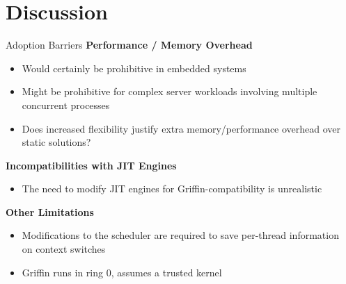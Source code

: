 \documentclass[12pt, dvipsnames, aspectratio=169]{beamer}
\begin{document}
\section{Discussion}

\begin{frame}[c]{Adoption Barriers}{}
  {\bf Performance / Memory Overhead}
  \begin{itemize}
    \item Would certainly be prohibitive in embedded systems
    \item Might be prohibitive for complex server workloads involving multiple concurrent processes
    \item Does increased flexibility justify extra memory/performance overhead over static solutions?
  \end{itemize}

  \vfill
  {\bf Incompatibilities with JIT Engines}
  \begin{itemize}
    \item The need to modify JIT engines for Griffin-compatibility is unrealistic
  \end{itemize}

  \vfill
  {\bf Other Limitations}
  \begin{itemize}
    \item Modifications to the scheduler are required to save per-thread information\\on context switches
    \item Griffin runs in ring 0, assumes a trusted kernel
  \end{itemize}
\end{frame}
\end{document}
